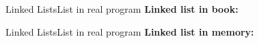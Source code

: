 
\begin{frame}{Linked Lists}{List in real program}
  \textbf{Linked list in book:}
  \vspace{-1.5em}
  \begin{flushleft}
    
  \end{flushleft}
\end{frame}


\begin{frame}{Linked Lists}{List in real program}
  \textbf{Linked list in memory:}
  \vspace{-1.5em}
  \begin{flushleft}
    
  \end{flushleft}
\end{frame}
